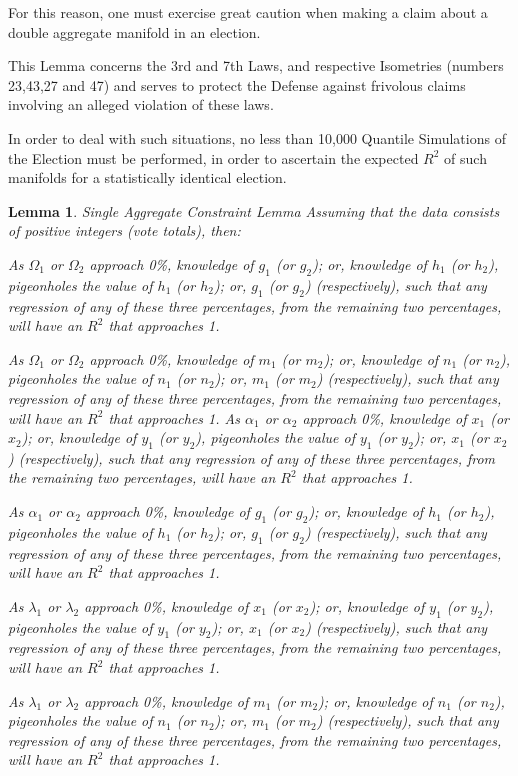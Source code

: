 \documentclass[preprint,13pt]{elsarticle}
\newtheorem{lemma}[theorem]{Lemma}
\begin{document}
For this reason, one must exercise great caution when making a claim about a double aggregate manifold in an election. 

This Lemma concerns the 3rd and 7th  Laws, and respective Isometries (numbers 23,43,27 and 47) and serves to protect the Defense against frivolous claims involving an alleged violation of these laws.

In order to deal with such situations, no less than 10,000 Quantile Simulations of the Election must be performed, in order to ascertain the expected $R^2$ of such manifolds for a statistically identical election.

\begin{lemma}{Single Aggregate Constraint Lemma}
Assuming that the data consists of positive integers (vote totals), then:

As $\Omega_{1}$ or $\Omega_{2}$ approach 0\%, knowledge of $g_{1}$ (or $g_{2}$); or, knowledge of $h_{1}$ (or $h_{2}$), pigeonholes the value of $h_{1}$ (or $h_{2}$); or, $g_{1}$ (or $g_{2}$) (respectively), such that any regression of any of these three percentages, from the remaining two percentages, will have an $R^2$ that approaches 1.

As $\Omega_{1}$ or $\Omega_{2}$ approach 0\%, knowledge of $m_{1}$ (or $m_{2}$); or, knowledge of $n_{1}$ (or $n_{2}$), pigeonholes the value of $n_{1}$ (or $n_{2}$); or, $m_{1}$ (or $m_{2}$) (respectively), such that any regression of any of these three percentages, from the remaining two percentages, will have an $R^2$ that approaches 1.
\newpage
As $\alpha_{1}$ or $\alpha_{2}$ approach 0\%, knowledge of $x_{1}$ (or $x_{2}$); or, knowledge of $y_{1}$ (or $y_{2}$), pigeonholes the value of $y_{1}$ (or $y_{2}$); or, $x_{1}$ (or $x_{2}$) (respectively), such that any regression of any of these three percentages, from the remaining two percentages, will have an $R^2$ that approaches 1.

As $\alpha_{1}$ or $\alpha_{2}$ approach 0\%, knowledge of $g_{1}$ (or $g_{2}$); or, knowledge of $h_{1}$ (or $h_{2}$), pigeonholes the value of $h_{1}$ (or $h_{2}$); or, $g_{1}$ (or $g_{2}$) (respectively), such that any regression of any of these three percentages, from the remaining two percentages, will have an $R^2$ that approaches 1.

As $\lambda_{1}$ or $\lambda_{2}$ approach 0\%, knowledge of $x_{1}$ (or $x_{2}$); or, knowledge of $y_{1}$ (or $y_{2}$), pigeonholes the value of $y_{1}$ (or $y_{2}$); or, $x_{1}$ (or $x_{2}$) (respectively), such that any regression of any of these three percentages, from the remaining two percentages, will have an $R^2$ that approaches 1.

As $\lambda_{1}$ or $\lambda_{2}$ approach 0\%, knowledge of $m_{1}$ (or $m_{2}$); or, knowledge of $n_{1}$ (or $n_{2}$), pigeonholes the value of $n_{1}$ (or $n_{2}$); or, $m_{1}$ (or $m_{2}$) (respectively), such that any regression of any of these three percentages, from the remaining two percentages, will have an $R^2$ that approaches 1.
\end{lemma}
\end{document}
